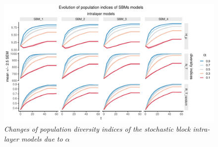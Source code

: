 \begin{figure}[!ht]
    \centering
    \includegraphics[width=\textwidth]{../figures/report/FigS4.pdf}
    \caption{\label{supp:4}
    \textit{Changes of population diversity indices of the stochastic block intra-layer models  due  to $\alpha$}
    }
\end{figure}